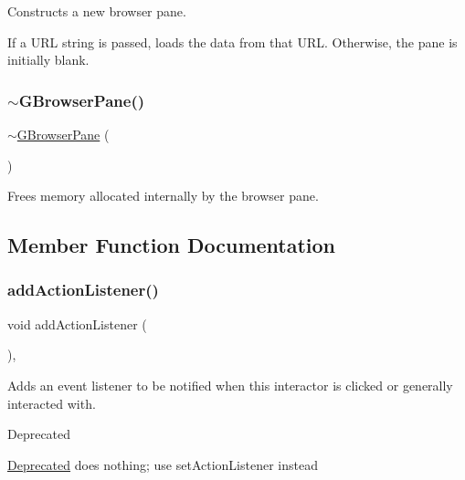 Constructs a new browser pane. 

If a U\+RL string is passed, loads the data from that U\+RL. Otherwise, the pane is initially blank. \mbox{\label{classGBrowserPane_a6539ae341df015236b39f5a166ec7184}} 
\subsubsection{\texorpdfstring{$\sim$\+G\+Browser\+Pane()}{~GBrowserPane()}}
{\footnotesize\ttfamily $\sim$\mbox{\hyperlink{classGBrowserPane}{G\+Browser\+Pane}} (\begin{DoxyParamCaption}{ }\end{DoxyParamCaption})\hspace{0.3cm}{\ttfamily [virtual]}}



Frees memory allocated internally by the browser pane. 



\subsection{Member Function Documentation}
\mbox{\label{classGInteractor_a02f20ea6edfa0671f31c4c648a253833}} 
\subsubsection{\texorpdfstring{add\+Action\+Listener()}{addActionListener()}}
{\footnotesize\ttfamily void add\+Action\+Listener (\begin{DoxyParamCaption}{ }\end{DoxyParamCaption})\hspace{0.3cm}{\ttfamily [virtual]}, {\ttfamily [inherited]}}



Adds an event listener to be notified when this interactor is clicked or generally interacted with. 

\begin{DoxyRefDesc}{Deprecated}
\item[\mbox{\hyperlink{deprecated__deprecated000006}{Deprecated}}]does nothing; use set\+Action\+Listener instead \end{DoxyRefDesc}
\mbox{\label{classGObservable_a80cfa040459ff53594adbd6a51ec8f43}} 
